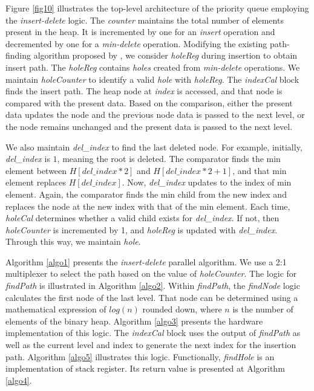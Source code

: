 \documentclass[10pt, conference, compsocconf]{IEEEtran}
\begin{document}
Figure \ref{fig10} illustrates the top-level architecture of the priority queue employing the {\it insert-delete} logic.
The {\it counter} maintains the total number of elements present in the heap.
It is incremented by one for an {\it insert} operation and decremented by one for a {\it min-delete} operation.
Modifying the existing path-finding algorithm proposed by \cite{pq6}, we consider {\it holeReg} during insertion to obtain insert path.
The {\it holeReg} contains {\it holes} created from {\it min-delete} operations.
We maintain {\it holeCounter} to identify a valid {\it hole} with {\it holeReg}.
The {\it indexCal} block finds the insert path.
The heap node at {\it index} is accessed, and that node is compared with the present data.
Based on the comparison, either the present data updates the node and the previous node data is passed to the next level, or the node remains unchanged and the present data is passed to the next level.

We also maintain {\it del\_index} to find the last deleted node.
For example, initially, {\it del\_index} is $1$, meaning the root is deleted.
The comparator finds the min element between $H[del\_index*2]$ and $H[del\_index*2 + 1]$, and that min element replaces $H[del\_index]$.
Now, {\it del\_index} updates to the index of min element.
Again, the comparator finds the min child from the new index and replaces the node at the new index with that of the min element.
Each time, {\it holeCal} determines whether a valid child exists for {\it del\_index}.
If not, then {\it holeCounter} is incremented by 1, and {\it holeReg} is updated with {\it del\_index}. 
Through this way, we maintain {\it hole}.

Algorithm \ref{algo1} presents the {\it insert-delete} parallel algorithm.
We use a 2:1 multiplexer to select the path based on the value of {\it holeCounter}.
The logic for {\it findPath} is illustrated in Algorithm \ref{algo2}.
Within {\it findPath}, the {\it findNode} logic calculates the first node of the last level.
That node can be determined using a mathematical expression of $log(n)$ rounded down, where $n$ is the number of elements of the binary heap.
Algorithm \ref{algo3} presents the hardware implementation of this logic.
The {\it indexCal} block uses the output of {\it findPath} as well as the current level and index to generate the next index for the insertion path. Algorithm \ref{algo5} illustrates this logic.
Functionally, {\it findHole} is an implementation of stack register. Its return value is presented at Algorithm \ref{algo4}.
\end{document}
